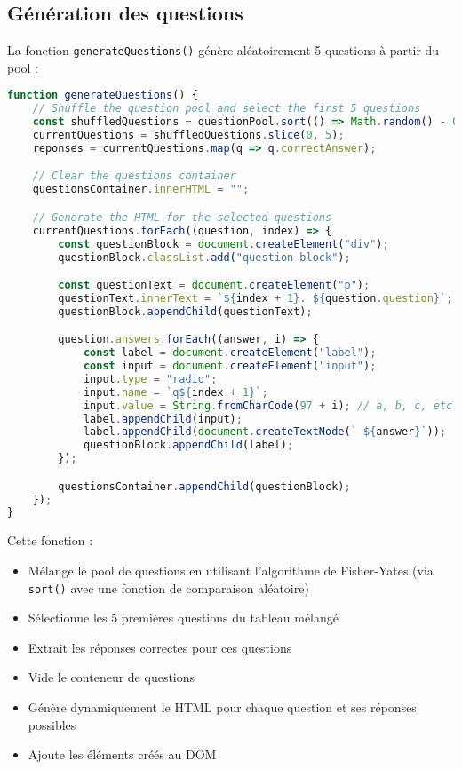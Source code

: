 \documentclass{article}
\begin{document}
\subsection{Génération des questions}
La fonction \texttt{generateQuestions()} génère aléatoirement 5 questions à partir du pool :

\begin{lstlisting}[language=JavaScript]
function generateQuestions() {
    // Shuffle the question pool and select the first 5 questions
    const shuffledQuestions = questionPool.sort(() => Math.random() - 0.5);
    currentQuestions = shuffledQuestions.slice(0, 5);
    reponses = currentQuestions.map(q => q.correctAnswer);

    // Clear the questions container
    questionsContainer.innerHTML = "";

    // Generate the HTML for the selected questions
    currentQuestions.forEach((question, index) => {
        const questionBlock = document.createElement("div");
        questionBlock.classList.add("question-block");

        const questionText = document.createElement("p");
        questionText.innerText = `${index + 1}. ${question.question}`;
        questionBlock.appendChild(questionText);

        question.answers.forEach((answer, i) => {
            const label = document.createElement("label");
            const input = document.createElement("input");
            input.type = "radio";
            input.name = `q${index + 1}`;
            input.value = String.fromCharCode(97 + i); // a, b, c, etc.
            label.appendChild(input);
            label.appendChild(document.createTextNode(` ${answer}`));
            questionBlock.appendChild(label);
        });

        questionsContainer.appendChild(questionBlock);
    });
}
\end{lstlisting}

Cette fonction :
\begin{itemize}
    \item Mélange le pool de questions en utilisant l'algorithme de Fisher-Yates (via \texttt{sort()} avec une fonction de comparaison aléatoire)
    \item Sélectionne les 5 premières questions du tableau mélangé
    \item Extrait les réponses correctes pour ces questions
    \item Vide le conteneur de questions
    \item Génère dynamiquement le HTML pour chaque question et ses réponses possibles
    \item Ajoute les éléments créés au DOM
\end{itemize}
\end{document}
